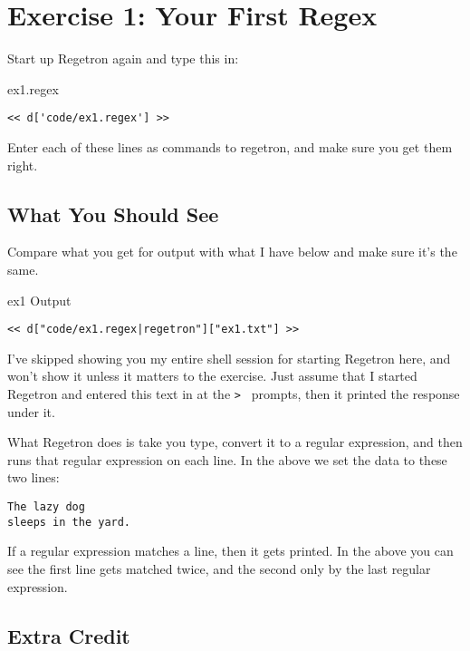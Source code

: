 \chapter{Exercise 1: Your First Regex}

Start up Regetron again and type this in:

\begin{code}{ex1.regex}
\begin{Verbatim}
<< d['code/ex1.regex'] >>
\end{Verbatim}
\end{code}

Enter each of these lines as commands to regetron, and make sure you get
them right.

\section{What You Should See}

Compare what you get for output with what I have below and
make sure it's the same.

\begin{code}{ex1 Output}
\begin{Verbatim}
<< d["code/ex1.regex|regetron"]["ex1.txt"] >>
\end{Verbatim}
\end{code}

I've skipped showing you my entire shell session for starting
Regetron here, and won't show it unless it matters to the exercise.
Just assume that I started Regetron and entered this text in at the
\verb|> | prompts, then it printed the response under it.

What Regetron does is take you type, convert it to a regular expression,
and then runs that regular expression on each line.  In the above
we set the data to these two lines:

\begin{Verbatim}
The lazy dog
sleeps in the yard.
\end{Verbatim}

If a regular expression matches a line, then it gets printed.  In the
above you can see the first line gets matched twice, and the second
only by the last regular expression.

\section{Extra Credit}


